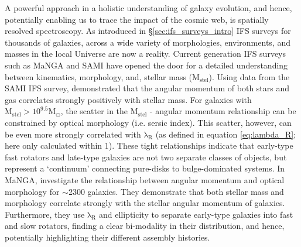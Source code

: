 A powerful approach in a holistic understanding of galaxy evolution, and hence, potentially enabling us to trace the impact of the cosmic web, is spatially resolved spectroscopy. As introduced in \S\ref{sec:ifs_surveys_intro} IFS surveys for thousands of galaxies, across a wide variety of morphologies, environments, and masses in the local Universe are now a reality. Current generation IFS surveys such as MaNGA and SAMI have opened the door for a detailed understanding between kinematics, morphology, and, stellar mass ($\mathrm{M_{stel}}$). Using data from the SAMI IFS survey, \citet{cortese2016} demonstrated that the angular momentum of both stars and gas correlates strongly positively with stellar mass. For galaxies with $\mathrm{M_{stel} > 10^{9.5} M_{\odot}}$, the scatter in the $\mathrm{M_{stel}}$ - angular momentum relationship can be constrained by optical morphology (i.e. sersic index). This scatter, however, can be even more strongly correlated with $\mathrm{\lambda_R}$ (as defined in equation \ref{eq:lambda_R}; here only calculated within 1\re). These tight relationships indicate that early-type fast rotators and late-type galaxies are not two separate classes of objects, but represent a `continuum' connecting pure-disks to bulge-dominated systems. In MaNGA, \citet{graham2018} investigate the relationship between angular momentum and optical morphology for $\sim$2300 galaxies. They demonstrate that both stellar mass and morphology correlate strongly with the stellar angular momentum of galaxies. Furthermore, they use $\mathrm{\lambda_R}$ and ellipticity to separate early-type galaxies into fast and slow rotators, finding a clear bi-modality in their distribution, and hence, potentially highlighting their different assembly histories. 

